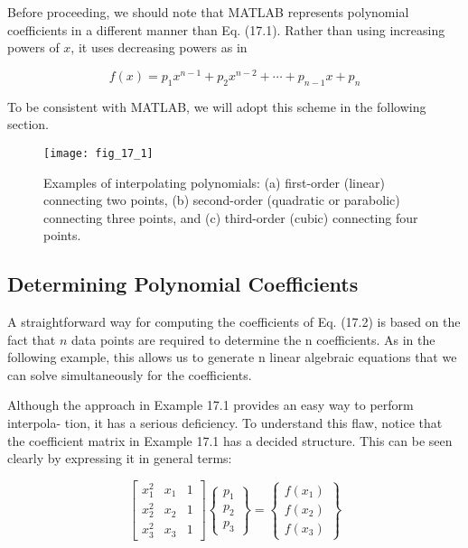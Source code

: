 \documentclass[../main.tex]{subfiles}
\begin{document}
Before proceeding, we should note that MATLAB represents polynomial coefficients
in a different manner than Eq. (17.1). Rather than using increasing powers of $x$, it uses decreasing powers as in

\begin{equation}
	\tag{17.2}
	f(x) = p_1 x ^ {n-1} + p_2 x ^ {n-2} + \cdots + p_{n-1} x + p_n
\end{equation}

\noindent To be consistent with MATLAB, we will adopt this scheme in the following section.

\begin{figure}[H] 
	\centering
	\texttt{[image: fig\_17\_1]}
	\caption{\textsf{Examples of interpolating polynomials: (a) first-order (linear) connecting two points,
	(b) second-order (quadratic or parabolic) connecting three points, and (c) third-order (cubic)
	connecting four points.}}
	\label{fig:fig_17_1}
\end{figure}

\label{cha:cha_P_17_1_1}
\subsection{Determining Polynomial Coefficients}

\noindent A straightforward way for computing the coefficients of Eq. (17.2) is based on the fact that
$n$ data points are required to determine the n coefficients. As in the following example, this
allows us to generate n linear algebraic equations that we can solve simultaneously for the
coefficients.


Although the approach in Example 17.1 provides an easy way to perform interpola-
tion, it has a serious deficiency. To understand this flaw, notice that the coefficient matrix
in Example 17.1 has a decided structure. This can be seen clearly by expressing it in general terms:

\begin{equation}
	\tag{17.3}
	\begin{bmatrix}
		x ^ 2 _ 1 & x_1 & 1 \\
		x ^ 2 _ 2 & x_2 & 1 \\
		x ^ 2 _ 3 & x_3 & 1
	\end{bmatrix}
	\begin{Bmatrix}
		p_1 \\ p_2 \\ p_3
	\end{Bmatrix}
	=
	\begin{Bmatrix}
		f(x_1) \\
		f(x_2) \\
		f(x_3)
	\end{Bmatrix}
\end{equation}
\end{document}
